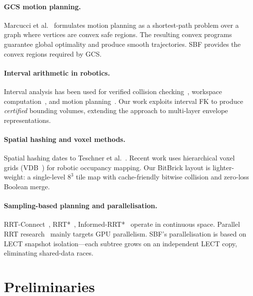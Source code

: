 \documentclass[journal]{IEEEtran}
\begin{document}
\paragraph{GCS motion planning.}
Marcucci et al.~\cite{marcucci2024motion} formulates motion planning
as a shortest-path problem over a graph where vertices are convex safe
regions.
The resulting convex programs guarantee global optimality and produce
smooth trajectories.
SBF provides the convex regions required by GCS.

\paragraph{Interval arithmetic in robotics.}
Interval analysis has been used for verified collision
checking~\cite{merlet2004solving}, workspace
computation~\cite{merlet2006interval}, and motion
planning~\cite{jaulin2001applied}.
Our work exploits interval FK to produce \emph{certified} bounding
volumes, extending the approach to multi-layer envelope representations.

\paragraph{Spatial hashing and voxel methods.}
Spatial hashing dates to Teschner et al.~\cite{teschner2003optimized}.
Recent work uses hierarchical voxel grids
(VDB~\cite{museth2013vdb}) for robotic occupancy mapping.
Our BitBrick layout is lighter-weight: a single-level $8^3$ tile map
with cache-friendly bitwise collision and zero-loss Boolean merge.

\paragraph{Sampling-based planning and parallelisation.}
RRT-Connect~\cite{kuffner2000rrt}, RRT*~\cite{karaman2011sampling},
Informed-RRT*~\cite{gammell2014informed} operate in continuous space.
Parallel RRT research~\cite{bialkowski2011massively} mainly targets
GPU parallelism.
SBF's parallelisation is based on LECT snapshot isolation---each
subtree grows on an independent LECT copy, eliminating shared-data
races.

\section{Preliminaries}\label{sec:prelim}
\end{document}
